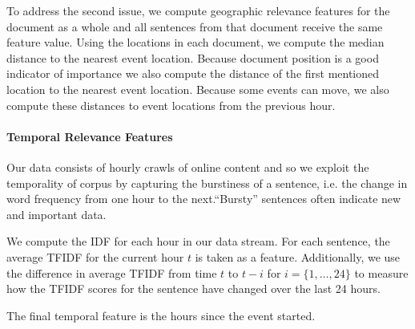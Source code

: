 To address the second issue, 
we compute geographic relevance features for the document as a whole and all
sentences from that document receive the same feature value.
Using the locations in each document, we compute the median distance to the 
nearest event location. Because document position is a good indicator 
of importance we also compute the distance of the first mentioned
location to the nearest event location. Because some events can move, we also
compute these distances to event locations from the previous hour.



\paragraph{Temporal Relevance Features}

Our data consists of hourly crawls of online content and so we exploit the temporality of corpus by capturing the burstiness of a sentence, i.e.  the change in word frequency from one hour to the next.``Bursty'' sentences often indicate new and important data. 

We compute the IDF for each hour in our data stream. 
For each sentence, the average TFIDF for the current hour $t$ is taken as a 
feature. Additionally, we use the difference in average TFIDF from time $t$
to $t-i$ for $i = \{1, \ldots, 24\}$ to measure how the TFIDF scores for the 
sentence have changed over the last 24 hours.

The final temporal feature is the hours since the event started.



